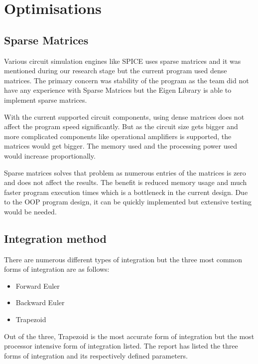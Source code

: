 \documentclass[12pt,a4paper]{article}
\begin{document}
\section{Optimisations}
\subsection{Sparse Matrices}
Various circuit simulation engines like SPICE uses sparse matrices and it was mentioned \cite{OOP} during our research stage but 
the current program used dense matrices. The primary concern was stability of the program as the team did not have 
any experience with Sparse Matrices but the Eigen Library is able to implement sparse matrices. \par
With the current supported circuit components, using dense matrices does not affect the program speed significantly. But as 
the circuit size gets bigger and more complicated components like operational amplifiers is supported, the matrices would
get bigger. The memory used and the processing power used would increase proportionally. \par
Sparse matrices solves that problem as numerous entries of the matrices is zero and does not affect the results. The benefit is
reduced memory usage and much faster program execution times which is a bottleneck in the current design.
Due to the OOP program design, it can be quickly implemented but extensive testing would be needed.
\subsection{Integration method}
There are numerous different types of integration but the three most common forms of integration are as follows:
\begin{itemize}
	\item Forward Euler
	\item Backward Euler
	\item Trapezoid
\end{itemize}
Out of the three, Trapezoid is the most accurate form of integration but the most processor intensive form of integration listed.
The report has listed the three forms of integration and its respectively defined parameters. 
\end{document}
